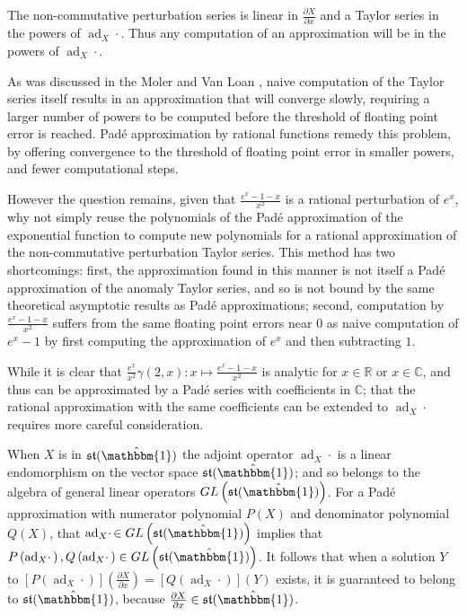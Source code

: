 The non-commutative perturbation series is linear in $\frac{\partial X}{\partial x}$  and a 
Taylor series in the powers of $\operatorname{ad}_X \cdotp$. Thus any computation of an 
approximation will be in the powers of $\operatorname{ad}_X \cdotp$.

As was discussed in the Moler and Van Loan \cite{moler_nineteen_1978,moler_nineteen_2003}, 
naive computation of the Taylor series itself results in an approximation that will converge 
slowly, requiring a larger number of powers to be computed before the threshold of floating 
point error is reached. Pad\'{e} approximation by rational functions remedy this problem, by
offering convergence to the threshold of floating point error in smaller powers, and fewer 
computational steps.

However the question remains, given that $\frac{e^{x} -1 - x}{x^2}$ is a rational 
perturbation of $e^x$, why not simply reuse the polynomials of the Pad\'{e} approximation of 
the exponential function to compute new polynomials for a rational approximation of the 
non-commutative perturbation Taylor series. This method has two shortcomings: first, the 
approximation found in this manner is not itself a Pad\'{e} approximation of the anomaly 
Taylor series, and so is not bound by the same theoretical asymptotic results as Pad\'{e} 
approximations; second, computation by $\frac{e^{x} - 1 - x}{x^2}$ suffers from the same 
floating point errors near $0$ as naive computation of $e^x - 1$ by first computing the
approximation of $e^x$ and then subtracting $1$.

While it is clear that $\frac{e^x}{x^2}\gamma\left(2,x\right) : x \mapsto \frac{e^{x} -1 - x}{x^2}$ 
is analytic for $x \in \mathbb{R}$ or $x \in \mathbb{C}$, and thus can be approximated by a 
Pad\'{e} series with coefficients in $\mathbb{C}$; that the rational approximation with the 
same coefficients can be extended to $\operatorname{ad}_X \cdotp$ requires more careful 
consideration.

When $X$ is in $\mathfrak{st}(\hat{\mathbbm{1}})$ the adjoint operator $\operatorname{ad}_X \cdotp$
is a linear endomorphism on the vector space $\mathfrak{st}(\hat{\mathbbm{1}})$; and so 
belongs to the algebra of general linear operators $GL\left(\mathfrak{st}(\hat{\mathbbm{1}})\right)$. 
For a Pad\'{e} approximation with numerator polynomial $P\left(X\right)$ and denominator 
polynomial $Q\left(X\right)$, that $\operatorname{ad}_X \cdotp \in GL\left(\mathfrak{st}(\hat{\mathbbm{1}})\right)$
implies that $P\left(\operatorname{ad}_X \cdotp\right), Q\left(\operatorname{ad}_X \cdotp\right) \in GL\left(\mathfrak{st}(\hat{\mathbbm{1}})\right)$.
It follows that when a solution $Y$ to $\left[P\left(\operatorname{ad}_X \cdotp\right)\right] \left(\frac{\partial X}{\partial x}\right) = \left[Q\left(\operatorname{ad}_X \cdotp\right)\right] \left(Y\right) $
exists, it is guaranteed to belong to $\mathfrak{st}(\hat{\mathbbm{1}})$, because $\frac{\partial X}{\partial x} \in \mathfrak{st}(\hat{\mathbbm{1}})$.

